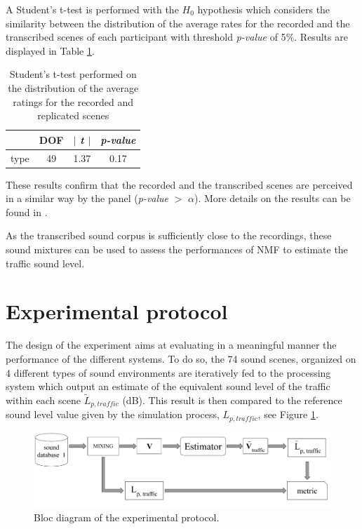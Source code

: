 \documentclass[review,5p,twocolumn,sort&compress,times]{elsarticle}
\begin{document}
A Student's t-test is performed with the $H_0$ hypothesis which considers the similarity between the distribution of the average rates for the recorded and the transcribed scenes of each participant with threshold \textit{p-value} of 5$\%$. Results are displayed in Table \ref{tab:ttest_type_of_scene}.

\begin{table}[t]
\centering
\begin{tabular}{cccc}
 	& \textbf{DOF} & \textbf{\textit{$\mid$ t $\mid$} }   & \textbf{\textit{p-value}} \\ 
\hline
 type & 49 & 1.37 &  0.17   \\
\hline
\end{tabular}
\caption{Student's t-test performed on the distribution of the average ratings for the recorded and replicated scenes}
\label{tab:ttest_type_of_scene}
\end{table}


These results confirm that the recorded and the transcribed scenes are perceived in a similar way by the panel (\textit{p-value} $>$ $\alpha$). More details on the results can be found in  \cite{gloaguen_creation_2017}.

As the transcribed sound corpus is sufficiently close to the recordings, these sound mixtures can be used to assess the performances of NMF to estimate the traffic sound level.

\section{Experimental protocol}\label{part:expProtocol}

The design of the experiment aims at evaluating in a meaningful manner the performance of the different systems. To do so, the 74 sound scenes, organized on 4 different types of sound environments are iteratively fed to the processing system which output an estimate of the equivalent sound level of the traffic within each scene $\tilde{L}_{p, traffic}$ (dB). This result is then compared to the reference sound level value given by the simulation process, $L_{p,traffic}$, see Figure \ref{fig:bloc_diagram_estimator}.

\begin{figure}[t]
\centering
\includegraphics[width=.9\linewidth]{figures/bloc_diagram_estimator.pdf}
\caption{Bloc diagram of the experimental protocol.}
\label{fig:bloc_diagram_estimator}
\end{figure}
\end{document}
